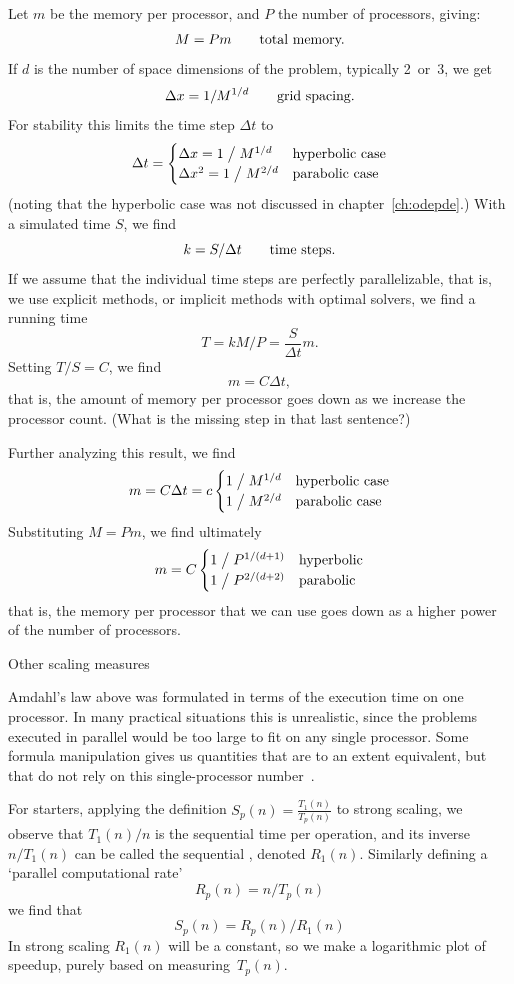 Let $m$ be the memory per processor, and $P$ the number of processors, giving:
\[ M=Pm\qquad\hbox{total memory.} \]
If $d$ is the number of space dimensions of the problem, typically 2~or~3,
we get
\[ \Delta x = 1/M^{1/d}\qquad\hbox{grid spacing.} \]
For stability this limits the time step $\Delta t$ to
\[ \Delta t=
\begin{cases}
\Delta x=1\bigm/M^{1/d}&\hbox{hyperbolic case}\\
\Delta x^2=1\bigm/M^{2/d}&\hbox{parabolic case}
\end{cases}
\]
(noting that the hyperbolic case was not discussed in chapter~\ref{ch:odepde}.)
With a simulated time $S$, we find
\[ k=S/\Delta t\qquad \hbox{time steps.} \]
If we assume that the individual time steps are perfectly parallelizable,
that is, we use explicit methods, or implicit methods with optimal solvers,
we find a running time
\[ T=kM/P=\frac{S}{\Delta t}m. \]
Setting $T/S=C$, we find
\[ m=C\Delta t, \]
that is, the amount of memory per processor goes down as we increase the processor
count. (What is the missing step in that last sentence?)

Further analyzing this result, we find
\[ m=C\Delta t = c
\begin{cases}
1\bigm/M^{1/d}&\hbox{hyperbolic case}\\
1\bigm/M^{2/d}&\hbox{parabolic case}
\end{cases}
\]
Substituting $M=Pm$, we find ultimately
\[ m = C
\begin{cases}
1\bigm/P^{1/(d+1)}&\hbox{hyperbolic}\\
1\bigm/P^{2/(d+2)}&\hbox{parabolic}
\end{cases}
\]
that is, the memory per processor that we can use
goes down as a higher power of the number of processors.

 {Other scaling measures}

Amdahl's law above was formulated in terms of the execution time on
one processor. In many practical situations this is unrealistic, since
the problems executed in parallel would be too large
to fit on any single processor.
Some formula manipulation gives us quantities that are to
an extent equivalent, but that do not rely on this single-processor
number~\cite{Moreland:formalmetrics2015}.

For starters, applying the definition
%
$S_p(n) = \frac{ T_1(n) }{ T_p(n) }$
%
to strong scaling, we observe that $T_1(n)/n$ is the sequential time
per operation, and its inverse $n/T_1(n)$ can be called the sequential
, denoted $R_1(n)$. Similarly
defining a `parallel computational rate'
\[ R_p(n) = n/T_p(n) \]
we find that
\[ S_p(n) = R_p(n)/R_1(n) \]
In strong scaling $R_1(n)$ will be a constant, so we
make a logarithmic plot of speedup, purely based on measuring~$T_p(n)$.


